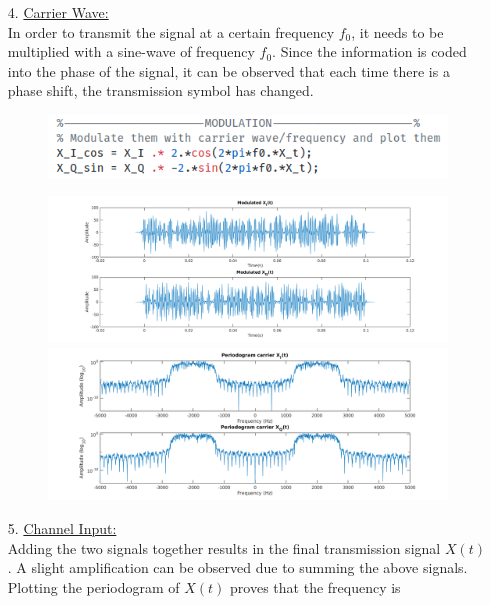 \documentclass[12pt, a4paper]{article}
\begin{document}
\begin{enumerate}
\begin{enumerate}
\begin{figure}[H]
        \end{figure}
        \item[4.] \underline{Carrier Wave:}\\
        In order to transmit the signal at a certain frequency \(f_0\), 
        it needs to be multiplied with a sine-wave of frequency \(f_0\). Since the information is coded into
        the phase of the signal, it can be observed that each time there is a phase shift, the transmission 
        symbol has changed.
        \begin{figure}[H]
            \centering
            \includegraphics[scale=0.9]{cos_mult.png}
        \end{figure}
        \begin{figure}[H]
            \centering
            \includegraphics[width=\textwidth]{modu.png}
            \includegraphics[width=\textwidth]{periodo_modu.png}
        \end{figure}
        \item[5.] \underline{Channel Input:}\\
        Adding the two signals together results in the final transmission signal \(X(t)\). A slight amplification
        can be observed due to summing the above signals. Plotting the periodogram of \(X(t)\) proves that the frequency is 

\end{enumerate}
\end{enumerate}
\end{document}
